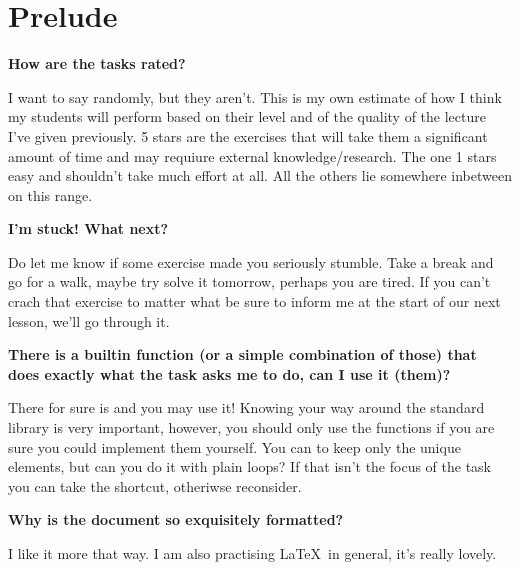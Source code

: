 



\setcounter{section}{-1}
\section{Prelude}

\begin{flushleft}
\textbf{How are the tasks rated?}
\end{flushleft}
\begin{flushright}
I want to say randomly, but they aren't. This is my own estimate of how I think
my students will perform based on their level and of the quality of the lecture
I've given previously. 5 stars are the exercises that will take them a
significant amount of time and may requiure external knowledge/research.
The one 1 stars easy and shouldn't take much effort at all. All the others lie 
somewhere inbetween on this range.
\end{flushright}

\begin{flushleft}
\textbf{I'm stuck! What next?}
\end{flushleft}
\begin{flushright}
Do let me know if some exercise made you seriously stumble. Take a break and
go for a walk, maybe try solve it tomorrow, perhaps you are tired. If you can't
crach that exercise to matter what be sure to inform me at the start of our
next lesson, we'll go through it.
\end{flushright}

\begin{flushleft}
\textbf{There is a builtin function (or a simple combination of those) that does
exactly what the task asks me to do, can I use it (them)?}
\end{flushleft}
\begin{flushright}
There for sure is and you may use it! Knowing your way around the standard library
is very important, however, you should only use the functions if you are sure
you could implement them yourself. You can \hbox{} to 
keep only the unique elements, but can you do it with plain  loops? If 
that isn't the focus of the task you can take the shortcut, otheriwse reconsider.
\end{flushright}

\begin{flushleft}
\textbf{Why is the document so exquisitely formatted?}
\end{flushleft}
\begin{flushright}
I like it more that way. I am also practising \LaTeX\ in general,
it's really lovely.
\end{flushright}

